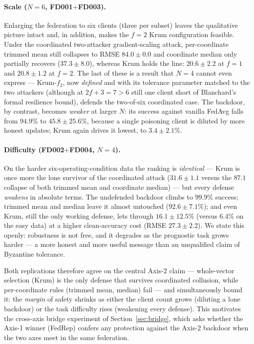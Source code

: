 \documentclass[a4paper,fleqn,doubleblind]{cas-sc}
\begin{document}
\paragraph{Scale ($N = 6$, FD001$+$FD003).}
Enlarging the federation to six clients (three per subset) leaves the
qualitative picture intact and, in addition, makes the $f = 2$ Krum
configuration feasible. Under the coordinated two-attacker
gradient-scaling attack, per-coordinate trimmed mean still collapses
to RMSE $84.0 \pm 0.0$ and coordinate median only partially recovers
($37.3 \pm 8.0$), whereas Krum holds the line: $20.6 \pm 2.2$ at
$f = 1$ and $20.8 \pm 1.2$ at $f = 2$. The last of these is a result
that $N = 4$ cannot even express --- Krum-$f_2$, now \emph{defined}
and with its tolerance parameter matched to the two attackers
(although at $2f + 3 = 7 > 6$ still one client short of Blanchard's
formal resilience bound), defends the two-of-six coordinated case. The backdoor, by contrast, becomes
\emph{weaker} at larger $N$: its success against vanilla FedAvg falls
from $94.9\%$ to $45.8 \pm 25.6\%$, because a single poisoning client
is diluted by more honest updates; Krum again drives it lowest, to
$3.4 \pm 2.1\%$.

\paragraph{Difficulty (FD002$+$FD004, $N = 4$).}
On the harder six-operating-condition data the ranking is
\emph{identical} --- Krum is once more the lone survivor of the
coordinated attack ($31.6 \pm 1.1$ versus the $87.1$ collapse of both
trimmed mean and coordinate median) --- but every defense
\emph{weakens} in absolute terms. The undefended backdoor climbs to
$99.9\%$ success; trimmed mean and median leave it almost untouched
($92.6 \pm 7.1\%$); and even Krum, still the only working defense,
lets through $16.1 \pm 12.5\%$ (versus $6.4\%$ on the easy data) at a
higher clean-accuracy cost (RMSE $27.3 \pm 2.2$). We state this
openly: robustness is not free, and it degrades as the prognostic
task grows harder --- a more honest and more useful message than an
unqualified claim of Byzantine tolerance.

Both replications therefore agree on the central Axis-2 claim ---
whole-vector selection (Krum) is the only defense that survives
coordinated collusion, while per-coordinate rules (trimmed mean,
median) fail --- and simultaneously bound it: the \emph{margin} of
safety shrinks as either the client count grows (diluting a lone
backdoor) or the task difficulty rises (weakening every defense).
This motivates the cross-axis bridge experiment of
Section~\ref{sec:bridge}, which asks whether the Axis-1 winner
(FedRep) confers any protection against the Axis-2 backdoor when the
two axes meet in the same federation.
\end{document}
